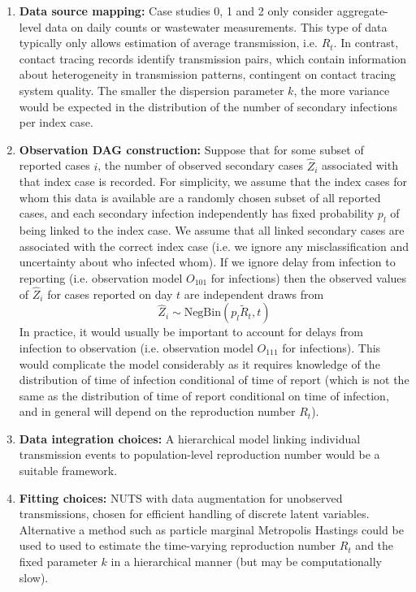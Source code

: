\documentclass{article}
\begin{document}
\begin{enumerate}
    \item \textbf{Data source mapping:} Case studies 0, 1 and 2 only consider aggregate-level data on daily counts or wastewater measurements. This type of data typically only allows estimation of average transmission, i.e. $R_t$. In contrast, contact tracing records identify transmission pairs, which contain information about heterogeneity in transmission patterns, contingent on contact tracing system quality. The smaller the dispersion parameter $k$, the more variance would be expected in the distribution of the number of secondary infections per index case.
    \item \textbf{Observation DAG construction:} Suppose that for some subset of reported cases $i$, the number of observed secondary cases $\hat{Z}_i$ associated with that index case is recorded. For simplicity, we assume that the index cases for whom this data is available are a randomly chosen subset of all reported cases, and each secondary infection independently has fixed probability $p_l$ of being linked to the index case. We assume that all linked secondary cases are associated with the correct index case (i.e. we ignore any misclassification and uncertainty about who infected whom). If we ignore delay from infection to reporting (i.e. observation model $O_{101}$ for infections) then the observed values of $\hat{Z}_i$ for cases reported on day $t$ are independent draws from
    \begin{equation} \label{eq:Zhat}
    \hat{Z}_i \sim \mathrm{NegBin}\left(p_l \tilde{R}_t, t\right)
    \end{equation}
    In practice, it would usually be important to account for delays from infection to observation (i.e. observation model $O_{111}$ for infections). This would complicate the model considerably as it requires knowledge of the distribution of time of infection conditional of time of report (which is not the same as the distribution of time of report conditional on time of infection, and in general will depend on the reproduction number $R_t$).
    \item \textbf{Data integration choices:} A hierarchical model linking individual transmission events to population-level reproduction number would be a suitable framework.
    \item \textbf{Fitting choices:} NUTS with data augmentation for unobserved transmissions, chosen for efficient handling of discrete latent variables. Alternative a method such as particle marginal Metropolis Hastings could be used to used to estimate the time-varying reproduction number $R_t$ and the fixed parameter $k$ in a hierarchical manner (but may be computationally slow). 
\end{enumerate}
\end{document}

